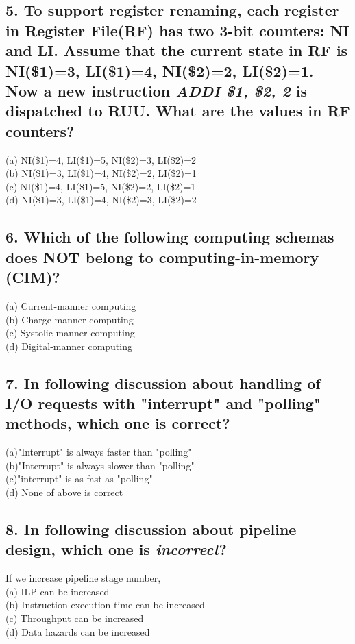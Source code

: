 \documentclass[UTF8]{ctexart}
\begin{document}
\subsection*{5. To support register renaming, each register in Register File(RF) has two 3-bit counters: NI and LI. Assume that the current state in RF is 
NI(\$1)=3, LI(\$1)=4, NI(\$2)=2, LI(\$2)=1. Now a new instruction {\bfseries\textit{ADDI \$1, \$2, 2}} is dispatched to RUU. What are the values in RF counters?}
(a) NI(\$1)=4, LI(\$1)=5, NI(\$2)=3, LI(\$2)=2\\
(b) NI(\$1)=3, LI(\$1)=4, NI(\$2)=2, LI(\$2)=1\\
(c) NI(\$1)=4, LI(\$1)=5, NI(\$2)=2, LI(\$2)=1\\
(d) NI(\$1)=3, LI(\$1)=4, NI(\$2)=3, LI(\$2)=2\\

\subsection*{6. Which of the following computing schemas does NOT belong to computing-in-memory (CIM)?}
(a) Current-manner computing\\
(b) Charge-manner computing\\
(c) Systolic-manner computing\\
(d) Digital-manner computing\\

\subsection*{7. In following discussion about handling of I/O requests with "interrupt" and "polling" methods, which one is correct?}
(a)"Interrupt" is always faster than "polling"\\
(b)"Interrupt" is always slower than "polling"\\
(c)"interrupt" is as fast as "polling"\\
(d) None of above is correct\\ 

\subsection*{8. In following discussion about pipeline design, which one is {\bfseries\textit{incorrect}}?}
If we increase pipeline stage number,\\
(a) ILP can be increased\\
(b) Instruction execution time can be increased\\
(c) Throughput can be increased\\
(d) Data hazards can be increased\\
\end{document}
